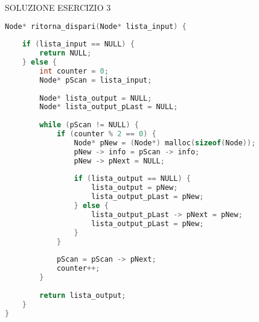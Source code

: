 
\begin{minipage}[h]{\linewidth}
	SOLUZIONE ESERCIZIO 3
    \begin{lstlisting}[language=C]
Node* ritorna_dispari(Node* lista_input) {
	
	if (lista_input == NULL) {
		return NULL;
	} else {
		int counter = 0;
		Node* pScan = lista_input;
		
		Node* lista_output = NULL;
		Node* lista_output_pLast = NULL;
		
		while (pScan != NULL) {
			if (counter % 2 == 0) {
				Node* pNew = (Node*) malloc(sizeof(Node));
				pNew -> info = pScan -> info;
				pNew -> pNext = NULL;
				
				if (lista_output == NULL) {
					lista_output = pNew;
					lista_output_pLast = pNew;
				} else {
					lista_output_pLast -> pNext = pNew;
					lista_output_pLast = pNew;
				}	    		
			}
			
			pScan = pScan -> pNext;
			counter++;
		}
		
		return lista_output;
	}
}
	\end{lstlisting}
\end{minipage}

